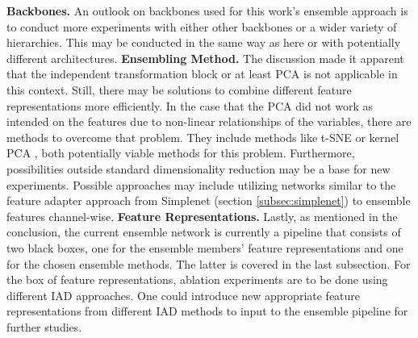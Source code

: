\textbf{Backbones.} An outlook on backbones used for this work's ensemble approach is to conduct more experiments with either other backbones or a wider variety of hierarchies. 
This may be conducted in the same way as here or with potentially different architectures.
\newline\newline
\textbf{Ensembling Method.} The discussion made it apparent that the independent transformation block \cite{EnsembleHeller2023} or at least PCA is not applicable in this context. 
Still, there may be solutions to combine different feature representations more efficiently. In the case that the PCA did not work as intended on the features due to non-linear 
relationships of the variables, there are methods to overcome that problem. They include methods like t-SNE\cite{tSNE} or kernel PCA \cite{Hoffmann_2007kernelPCA}, both potentially 
viable methods for this problem. Furthermore, possibilities outside standard dimensionality reduction may be a base for new experiments. Possible approaches may include 
utilizing networks similar to the feature adapter approach from Simplenet (section \ref{subsec:simplenet}) to ensemble features channel-wise.
\newline\newline
\textbf{Feature Representations.} Lastly, as mentioned in the conclusion, the current ensemble network is currently a pipeline that consists of two black boxes, one for the ensemble 
members' feature representations and one for the chosen ensemble methods. The latter is covered in the last subsection. For the box of feature representations, ablation experiments are to be done using different IAD approaches. One could introduce new appropriate feature representations from different IAD methods to input to the ensemble pipeline for 
further studies.






